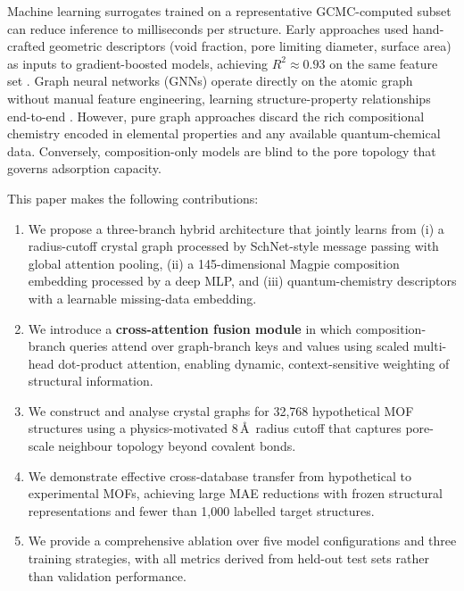 \documentclass[conference]{IEEEtran}
\begin{document}
Machine learning surrogates trained on a representative GCMC-computed subset
can reduce inference to milliseconds per structure.  Early approaches used
hand-crafted geometric descriptors (void fraction, pore limiting diameter,
surface area) as inputs to gradient-boosted models, achieving $R^2 \approx 0.93$
on the same feature set \cite{cgcnn2018}.  Graph neural networks (GNNs) operate
directly on the atomic graph without manual feature engineering, learning
structure-property relationships end-to-end \cite{schnet2018,cgcnn2018,
megnet2019}.  However, pure graph approaches discard the rich compositional
chemistry encoded in elemental properties and any available quantum-chemical
data.  Conversely, composition-only models are blind to the pore topology
that governs adsorption capacity.

This paper makes the following contributions:
\begin{enumerate}
  \item We propose a three-branch hybrid architecture that jointly learns
        from (i) a radius-cutoff crystal graph processed by SchNet-style
        message passing with global attention pooling, (ii) a 145-dimensional
        Magpie composition embedding processed by a deep MLP, and (iii)
        quantum-chemistry descriptors with a learnable missing-data embedding.
  \item We introduce a \textbf{cross-attention fusion module} in which
        composition-branch queries attend over graph-branch keys and values
        using scaled multi-head dot-product attention, enabling dynamic,
        context-sensitive weighting of structural information.
  \item We construct and analyse crystal graphs for 32{,}768 hypothetical
        MOF structures using a physics-motivated 8\,\AA\ radius cutoff that
        captures pore-scale neighbour topology beyond covalent bonds.
  \item We demonstrate effective cross-database transfer from hypothetical to
        experimental MOFs, achieving large MAE reductions with frozen structural
        representations and fewer than 1{,}000 labelled target structures.
  \item We provide a comprehensive ablation over five model configurations
        and three training strategies, with all metrics derived from
        held-out test sets rather than validation performance.
\end{enumerate}

\end{document}
